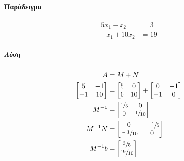 \documentclass[11pt,a4paper,notitlepage,fleqn]{article}
\begin{document}
\paragraph{Παράδειγμα}
\begin{align*}
5x_1-x_2 &= 3 \\
-x_1+10x_2 &= 19
\end{align*}

\subparagraph{Λύση}
\begin{align*}
	A &= M + N \\
	\left[ \begin{matrix}
	5 & -1 \\ -1 & 10
	\end{matrix} \right] &= \left[\begin{matrix}
	5 & 0 \\ 0 & 10
	\end{matrix}\right] + \left[\begin{matrix}
	0 & -1 \\ -1 & 0
	\end{matrix}\right] \\
	M^{-1} &= \left[\begin{matrix}
	\sfrac{1}{5} & 0 \\ 0 & \sfrac{1}{10} 
	\end{matrix}\right] \\
	M^{-1}N &= \left[\begin{matrix}
	0 & \sfrac{-1}{5} \\ \sfrac{-1}{10}  & 0
	\end{matrix}\right] \\
	M^{-1}b &= \left[\begin{matrix}
	\sfrac{3}{5} \\ \sfrac{19}{10} 
	\end{matrix}\right]
\end{align*}
\end{document}
